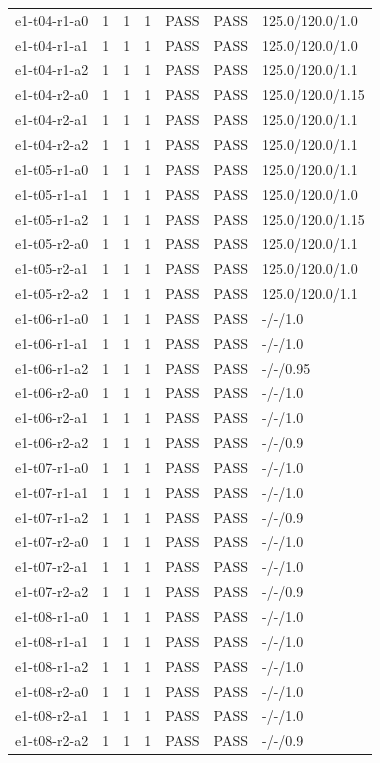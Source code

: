 \begin{longtable}{lllllll}
e1-t04-r1-a0 & 1 & 1 & 1 & PASS & PASS & 125.0/120.0/1.0 \\
e1-t04-r1-a1 & 1 & 1 & 1 & PASS & PASS & 125.0/120.0/1.0 \\
e1-t04-r1-a2 & 1 & 1 & 1 & PASS & PASS & 125.0/120.0/1.1 \\
e1-t04-r2-a0 & 1 & 1 & 1 & PASS & PASS & 125.0/120.0/1.15 \\
e1-t04-r2-a1 & 1 & 1 & 1 & PASS & PASS & 125.0/120.0/1.1 \\
e1-t04-r2-a2 & 1 & 1 & 1 & PASS & PASS & 125.0/120.0/1.1 \\
e1-t05-r1-a0 & 1 & 1 & 1 & PASS & PASS & 125.0/120.0/1.1 \\
e1-t05-r1-a1 & 1 & 1 & 1 & PASS & PASS & 125.0/120.0/1.0 \\
e1-t05-r1-a2 & 1 & 1 & 1 & PASS & PASS & 125.0/120.0/1.15 \\
e1-t05-r2-a0 & 1 & 1 & 1 & PASS & PASS & 125.0/120.0/1.1 \\
e1-t05-r2-a1 & 1 & 1 & 1 & PASS & PASS & 125.0/120.0/1.0 \\
e1-t05-r2-a2 & 1 & 1 & 1 & PASS & PASS & 125.0/120.0/1.1 \\
e1-t06-r1-a0 & 1 & 1 & 1 & PASS & PASS & -/-/1.0 \\
e1-t06-r1-a1 & 1 & 1 & 1 & PASS & PASS & -/-/1.0 \\
e1-t06-r1-a2 & 1 & 1 & 1 & PASS & PASS & -/-/0.95 \\
e1-t06-r2-a0 & 1 & 1 & 1 & PASS & PASS & -/-/1.0 \\
e1-t06-r2-a1 & 1 & 1 & 1 & PASS & PASS & -/-/1.0 \\
e1-t06-r2-a2 & 1 & 1 & 1 & PASS & PASS & -/-/0.9 \\
e1-t07-r1-a0 & 1 & 1 & 1 & PASS & PASS & -/-/1.0 \\
e1-t07-r1-a1 & 1 & 1 & 1 & PASS & PASS & -/-/1.0 \\
e1-t07-r1-a2 & 1 & 1 & 1 & PASS & PASS & -/-/0.9 \\
e1-t07-r2-a0 & 1 & 1 & 1 & PASS & PASS & -/-/1.0 \\
e1-t07-r2-a1 & 1 & 1 & 1 & PASS & PASS & -/-/1.0 \\
e1-t07-r2-a2 & 1 & 1 & 1 & PASS & PASS & -/-/0.9 \\
e1-t08-r1-a0 & 1 & 1 & 1 & PASS & PASS & -/-/1.0 \\
e1-t08-r1-a1 & 1 & 1 & 1 & PASS & PASS & -/-/1.0 \\
e1-t08-r1-a2 & 1 & 1 & 1 & PASS & PASS & -/-/1.0 \\
e1-t08-r2-a0 & 1 & 1 & 1 & PASS & PASS & -/-/1.0 \\
e1-t08-r2-a1 & 1 & 1 & 1 & PASS & PASS & -/-/1.0 \\
e1-t08-r2-a2 & 1 & 1 & 1 & PASS & PASS & -/-/0.9 \\
\bottomrule
\end{longtable}
